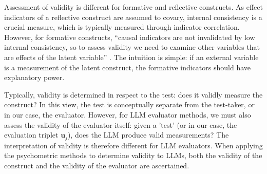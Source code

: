 

Assessment of validity is different for formative and reflective constructs. As effect indicators of a reflective construct are assumed to covary, internal consistency is a crucial measure, which is typically measured through indicator correlation. However, for formative constructs, “causal indicators are not invalidated by low internal consistency, so to assess validity we need to examine other variables that are effects of the latent variable” \citep{bollen1991conventional}. The intuition is simple: if an external variable is a measurement of the latent construct, the formative indicators should have explanatory power. %

Typically, validity is determined in respect to the test: does it validly measure the construct? In this view, the test is conceptually separate from the test-taker, or in our case, the evaluator. However, for LLM evaluator methods, we must also assess the validity of the evaluator itself: given a 'test' (or in our case, the evaluation triplet $\mathbf{u}_j$), does the LLM produce valid measurements? The interpretation of validity is therefore different for LLM evaluators. When applying the psychometric methods to determine validity to LLMs, both the validity of the construct and the validity of the evaluator are ascertained. %

